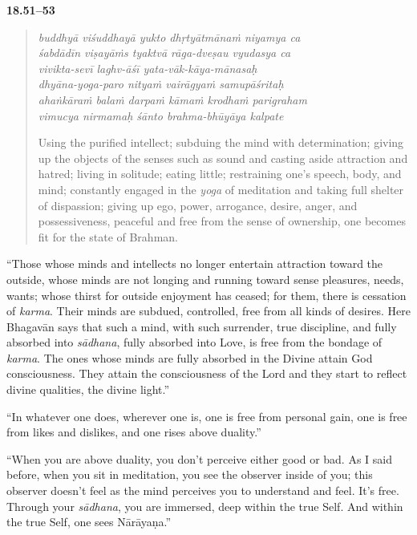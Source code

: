 \par\noindent\textbf{18.51–53}\par
\begin{verse}
\textit{buddhyā viśuddhayā yukto dhṛtyātmānaṁ niyamya ca} \\
\textit{śabdādīn viṣayāṁs tyaktvā rāga-dveṣau vyudasya ca} \\
\textit{vivikta-sevī laghv-āśī yata-vāk-kāya-mānasaḥ} \\
\textit{dhyāna-yoga-paro nityaṁ vairāgyaṁ samupāśritaḥ} \\
\textit{ahaṅkāraṁ balaṁ darpaṁ kāmaṁ krodhaṁ parigraham} \\
\textit{vimucya nirmamaḥ śānto brahma-bhūyāya kalpate}

\noindent Using the purified intellect; subduing the mind with determination; giving up the objects of the senses such as sound and casting aside attraction and hatred; living in solitude; eating little; restraining one's speech, body, and mind; constantly engaged in the \textit{yoga} of meditation and taking full shelter of dispassion; giving up ego, power, arrogance, desire, anger, and possessiveness, peaceful and free from the sense of ownership, one becomes fit for the state of Brahman.
\end{verse}
\par


\enquote{Those whose minds and intellects no longer entertain attraction toward the outside, whose minds are not longing and running toward sense pleasures, needs, wants; whose thirst for outside enjoyment has ceased; for them, there is cessation of \textit{karma}. Their minds are subdued, controlled, free from all kinds of desires. Here Bhagavān says that such a mind, with such surrender, true discipline, and fully absorbed into \textit{sādhana}, fully absorbed into Love, is free from the bondage of \textit{karma}. The ones whose minds are fully absorbed in the Divine attain God consciousness. They attain the consciousness of the Lord and they start to reflect divine qualities, the divine light.}

\enquote{In whatever one does, wherever one is, one is free from personal gain, one is free from likes and dislikes, and one rises above duality.}

\enquote{When you are above duality, you don’t perceive either good or bad. As I said before, when you sit in meditation, you see the observer inside of you; this observer doesn’t feel as the mind perceives you to understand and feel. It’s free. Through your \textit{sādhana}, you are immersed, deep within the true Self. And within the true Self, one sees Nārāyaṇa.}

